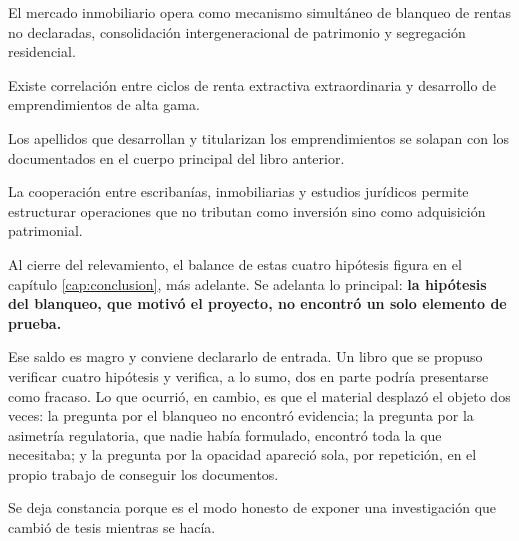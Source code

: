 \begin{description}[leftmargin=2.2cm,style=nextline]
\item[H.20] El mercado inmobiliario opera como mecanismo simultáneo de blanqueo de rentas no declaradas, consolidación intergeneracional de patrimonio y segregación residencial.
\item[H.21] Existe correlación entre ciclos de renta extractiva extraordinaria y desarrollo de emprendimientos de alta gama.
\item[H.22] Los apellidos que desarrollan y titularizan los emprendimientos se solapan con los documentados en el cuerpo principal del libro anterior.
\item[H.23] La cooperación entre escribanías, inmobiliarias y estudios jurídicos permite estructurar operaciones que no tributan como inversión sino como adquisición patrimonial.
\end{description}

Al cierre del relevamiento, el balance de estas cuatro hipótesis figura en el capítulo \ref{cap:conclusion}, más adelante. Se adelanta lo principal: \textbf{la hipótesis del blanqueo, que motivó el proyecto, no encontró un solo elemento de prueba.}

\begin{cautela}
Ese saldo es magro y conviene declararlo de entrada. Un libro que se propuso verificar cuatro hipótesis y verifica, a lo sumo, dos en parte podría presentarse como fracaso. Lo que ocurrió, en cambio, es que el material desplazó el objeto dos veces: la pregunta por el blanqueo no encontró evidencia; la pregunta por la asimetría regulatoria, que nadie había formulado, encontró toda la que necesitaba; y la pregunta por la opacidad apareció sola, por repetición, en el propio trabajo de conseguir los documentos.

Se deja constancia porque es el modo honesto de exponer una investigación que cambió de tesis mientras se hacía.
\end{cautela}

